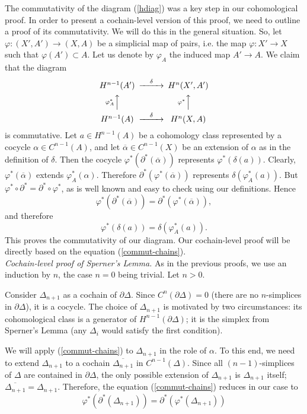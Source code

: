 \documentclass[leqno, 11pt]{article}\usepackage{latexsym}\usepackage{amsmath, amscd}\usepackage{amssymb}
\begin{document}
The commutativity of the diagram (\ref{hdiag}) was a key step in our cohomological proof. In order to present a cochain-level version of this proof, 
we need to outline a proof of its commutativity. We will do this in the general situation.
So, let $\varphi : (X',A')\rightarrow (X,A)$ be a simplicial map of pairs, i.e. the map $\varphi: X'\rightarrow X$ such that $\varphi(A')\subset A$. 
Let us denote by $\varphi_A$ the induced map $A'\rightarrow A$. We claim that the diagram
\[
\begin{CD}
H^{n-1}(A') @>{\delta}>> H^n(X',A')\\
@A{\varphi_{A}^*}AA @A{\varphi^*}AA\\
H^{n-1}(A) @>{\delta}>> H^n(X,A)
\end{CD}
\]
is commutative. 
Let $a\in H^{n-1}(A)$ be a cohomology class represented by a cocycle $\alpha\in C^{n-1}(A)$, 
and let $\overline{\alpha}\in C^{n-1}(X)$ be an extension of $\alpha$ as in the definition of $\delta$. Then the cocycle $\varphi^*(\partial^*(\overline{\alpha}))$ represents
$\varphi^*(\delta(a))$. Clearly, $\varphi^*(\overline{\alpha})$
extends $\varphi_A^*(\alpha)$. 
Therefore $\partial^*(\varphi^*(\overline{\alpha}))$ represents $\delta(\varphi_A^*(a))$. 
But $\varphi^*\circ\partial^*=\partial^*\circ\varphi^*$, 
as is well known and easy to check using our definitions. Hence
\begin{equation}
\label{commut-chains}
\varphi^*(\partial^*(\overline{\alpha}))=\partial^*(\varphi^*(\overline{\alpha})),
\end{equation}
and therefore
\[
\varphi^*(\delta(a))=\delta(\varphi_A^*(a)).
\]  
This proves the commutativity of our diagram. Our cochain-level proof will be directly based on the equation (\ref{commut-chains}).\\
 
\noindent
{\em Cochain-level proof of Sperner's Lemma.} As in the previous proofs, we use an induction by $n$, the case $n=0$ being trivial. Let $n>0$.

Consider $\Delta_{n+1}$ as a cochain of $\partial\Delta$. 
Since $C^n(\partial\Delta)=0$ (there are no $n$-simplices in $\partial\Delta$), it is a cocycle.
The choice of $\Delta_{n+1}$ is motivated by two circumstances: its cohomological class is a generator of $H^{n-1}(\partial\Delta)$; 
it is the simplex from Sperner's Lemma (any $\Delta_i$ would satisfy the first condition).

We will apply (\ref{commut-chains}) to $\Delta_{n+1}$ in the role of $\alpha$. To this end, 
we need to extend $\Delta_{n+1}$ to a cochain $\overline{\Delta_{n+1}}$ in $C^{n-1}(\Delta)$.
Since all $(n-1)$-simplices of $\Delta$ are contained in $\partial\Delta$, the only possible extension of $\Delta_{n+1}$ is $\Delta_{n+1}$ itself;
$\overline{\Delta_{n+1}}=\Delta_{n+1}$. Therefore, the equation (\ref{commut-chains}) reduces in our case to
\begin{equation}
\label{rc-chains}
\varphi^*(\partial^*(\Delta_{n+1}))=\partial^*(\varphi^*(\Delta_{n+1}))
\end{equation}
\end{document}
